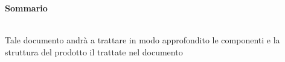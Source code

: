 \noindent\begin{Large}\textbf{Sommario}\end{Large}\\
\noindent Tale documento andrà a trattare in modo approfondito le componenti e la struttura del prodotto il \progetto{} trattate nel documento \SpecificaTecnica{}\\


